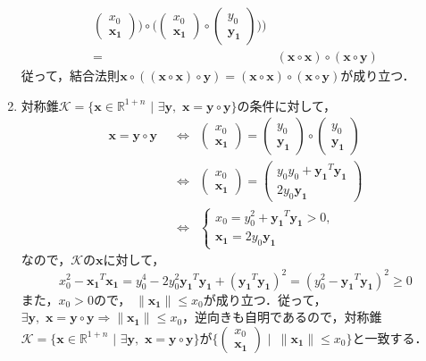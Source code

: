 \documentclass[a4paper,11pt]{jsarticle}
\numberwithin{theorem}{section}  %
\numberwithin{equation}{section} %
\begin{document}
\begin{enumerate}
\[\begin{split}
 \begin{pmatrix} x_0\\ \bm{x_1} \end{pmatrix} \Bigr) \circ \Bigr(
\begin{pmatrix} x_0\\ \bm{x_1} \end{pmatrix}  \circ
\begin{pmatrix} y_0\\ \bm{y_1} \end{pmatrix} \Bigr)\Bigr)\\
=\,\,\, & (\bm{x} \circ \bm{x}) \circ ( \bm{x} \circ \bm{y})
\end{split}
\]
従って，結合法則$\bm{x} \circ ( ( \bm{x} \circ \bm{x}) \circ \bm{y} ) = (\bm{x} \circ \bm{x}) \circ ( \bm{x} \circ \bm{y})$が成り立つ．
\item 対称錐$\mathcal{K} = \{ \bm{x} \in \mathbb{R}^{1+n}\,\, |\,\, \exists \bm{y}, \,\, \bm{x} = \bm{y} \circ \bm{y} \}$の条件に対して，
\[
\begin{split}
\bm{x} = \bm{y} \circ \bm{y} \,\,\, & \Longleftrightarrow \,\,\,  \begin{pmatrix} x_0\\ \bm{x_1} \end{pmatrix} = \begin{pmatrix} y_0\\ \bm{y_1} \end{pmatrix} \circ \begin{pmatrix} y_0\\ 
\bm{y_1} \end{pmatrix}\\
& \Longleftrightarrow \,\,\,  \begin{pmatrix} x_0\\ \bm{x_1} \end{pmatrix} = \begin{pmatrix} y_0y_0 + \bm{y_1}^T\bm{y_1} \\ 2y_0\bm{y_1} \end{pmatrix}\\
& \Longleftrightarrow \,\,\, \begin{cases} x_0 = y_0^2 + \bm{y_1}^T\bm{y_1} > 0, \\ \bm{x_1}=2y_0\bm{y_1}  \end{cases}
\end{split}
\]
なので，$\mathcal{K}$の$\bm{x}$に対して，
\[
x_0^2 - \bm{x_1}^T\bm{x_1} = y_0^4 - 2y_0^2\bm{y_1}^T\bm{y_1} + (\bm{y_1}^T\bm{y_1})^2 = (y_0^2 -\bm{y_1}^T\bm{y_1})^2 \ge 0 \]
また，$x_0 > 0$ので， $\|\bm{x_1}\| \le x_0$が成り立つ．従って，$\exists \bm{y}, \,\, \bm{x} = \bm{y} \circ \bm{y} \Rightarrow \|\bm{x_1}\| \le x_0$，逆向きも自明であるので，対称錐$\mathcal{K} = \{ \bm{x} \in \mathbb{R}^{1+n}\,\, |\,\, \exists \bm{y}, \,\, \bm{x} = \bm{y} \circ \bm{y} \}$が$\Bigr\{\begin{pmatrix}
x_0 \\ \bm{x_1}
\end{pmatrix} \,\, \Bigr| \,\,\, \|\bm{x_1}\| \le x_0
 \Bigr\}$と一致する．



\end{enumerate}
\end{document}
